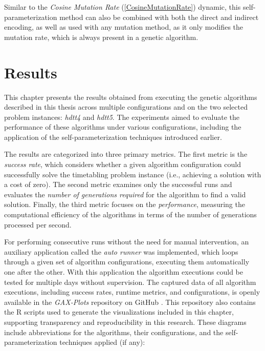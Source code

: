 \documentclass[english,examples]{isasthesis}
\begin{document}
Similar to the \textit{Cosine Mutation Rate} (\ref{CosineMutationRate}) dynamic,
this self-parameterization method can also be combined with both the direct
and indirect encoding, as well as used with any mutation method, as it only
modifies the mutation rate, which is always present in a genetic algorithm.


\chapter{Results}
This chapter presents the results obtained from executing the genetic
algorithms described in this thesis across multiple configurations and on the
two selected problem instances: \textit{hdtt4} and \textit{hdtt5}.
The experiments aimed to evaluate the performance of these algorithms under
various configurations, including the application of the self-parameterization
techniques introduced earlier.

The results are categorized into three primary metrics.
%
The first metric is the \textit{success rate}, which considers whether a given
algorithm configuration could successfully solve the timetabling problem
instance (i.e., achieving a solution with a cost of zero).
%
The second metric examines only the successful runs and evaluates the
\textit{number of generations required} for the algorithm to find a valid
solution.
%
Finally, the third metric focuses on the \textit{performance}, measuring the
computational efficiency of the algorithms in terms of the number of
generations processed per second.

For performing consecutive runs without the need for manual intervention, an
auxiliary application called the \textit{auto runner} was implemented, which
loops through a given set of algorithm configurations, executing them
automatically one after the other.
With this application the algorithm executions could be tested for multiple
days without supervision.
The captured data of all algorithm executions, including success rates, runtime
metrics, and configurations, is openly available in the \textit{GAX-Plots}
repository on GitHub \cite{code-gax-plots}. This repository also contains the
R scripts used to generate the visualizations included in this chapter,
supporting transparency and reproducibility in this research.
These diagrams include abbreviations for the algorithms,
their configurations, and the self-parameterization techniques applied
(if any):
\end{document}
